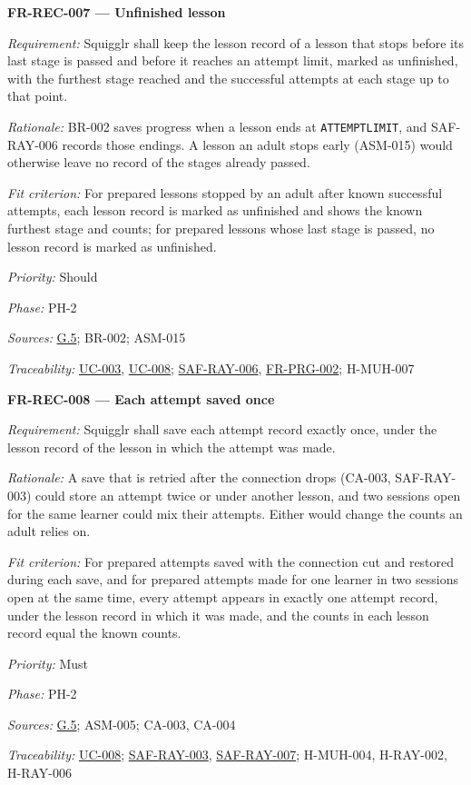 \documentclass[12pt]{article}
\renewcommand{\_}{\textunderscore\allowbreak}%
\newcommand{\goalref}[1]{\hyperref[goal:#1]{G.#1}}
\newcommand{\ucref}[1]{\hyperref[uc:#1]{\mbox{UC-#1}}}
\newenvironment{srsrequirement}[2]{%
  \par\medskip\noindent\phantomsection\label{req:#1}%
  \textbf{#1 --- #2}\par\nobreak\smallskip }{\par\medskip}
\newcommand{\reqfield}[2]{\noindent\textit{#1:} #2\par}
\newcommand{\reqshall}[1]{\reqfield{Requirement}{#1}}
\newcommand{\reqrationale}[1]{\reqfield{Rationale}{#1}}
\newcommand{\reqfit}[1]{\reqfield{Fit criterion}{#1}}
\newcommand{\reqpriority}[1]{\reqfield{Priority}{#1}}
\newcommand{\reqphase}[1]{\reqfield{Phase}{#1}}
\newcommand{\reqsources}[1]{\reqfield{Sources}{#1}}
\newcommand{\reqtraces}[1]{\reqfield{Traceability}{#1}}
\newcommand{\reqref}[1]{\hyperref[req:#1]{#1}}
\providecommand{\ucref}[1]{\hyperref[uc:#1]{UC-#1}}
\begin{document}
\begin{srsrequirement}{FR-REC-007}{Unfinished lesson}
  \reqshall{Squigglr shall keep the lesson record of a lesson that stops before
its last stage is passed and before it reaches an attempt limit, marked as
unfinished, with the furthest stage reached and the successful attempts at each
stage up to that point.} \reqrationale{BR-002 saves progress when a lesson ends
at \texttt{ATTEMPT\_\allowbreak LIMIT}, and SAF-RAY-006 records those endings. A
lesson an adult stops early (ASM-015) would otherwise leave no record of the
stages already passed.} \reqfit{For prepared lessons stopped by an adult after
known successful attempts, each lesson record is marked as unfinished and shows
the known furthest stage and counts; for prepared lessons whose last stage is
passed, no lesson record is marked as unfinished.}
  \reqpriority{Should}
  \reqphase{PH-2}
  \reqsources{\goalref{5}; BR-002; ASM-015} \reqtraces{\ucref{003}, \ucref{008};
  \reqref{SAF-RAY-006}, \reqref{FR-PRG-002}; H-MUH-007}
\end{srsrequirement}

\begin{srsrequirement}{FR-REC-008}{Each attempt saved once}
  \reqshall{Squigglr shall save each attempt record exactly once, under the
lesson record of the lesson in which the attempt was made.} \reqrationale{A save
that is retried after the connection drops (CA-003, SAF-RAY-003) could store an
attempt twice or under another lesson, and two sessions open for the same
learner could mix their attempts. Either would change the counts an adult relies
on.} \reqfit{For prepared attempts saved with the connection cut and restored
during each save, and for prepared attempts made for one learner in two sessions
open at the same time, every attempt appears in exactly one attempt record,
under the lesson record in which it was made, and the counts in each lesson
record equal the known counts.}
  \reqpriority{Must}
  \reqphase{PH-2}
  \reqsources{\goalref{5}; ASM-005; CA-003, CA-004} \reqtraces{\ucref{008};
  \reqref{SAF-RAY-003}, \reqref{SAF-RAY-007}; H-MUH-004, H-RAY-002, H-RAY-006}
\end{srsrequirement}
\end{document}
